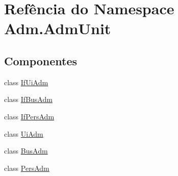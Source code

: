 \hypertarget{namespaceAdm_1_1AdmUnit}{\section{Refência do Namespace Adm.\-Adm\-Unit}
\label{de/d94/namespaceAdm_1_1AdmUnit}
}
\subsection*{Componentes}
\begin{DoxyCompactItemize}
\item 
class \hyperlink{classAdm_1_1AdmUnit_1_1IfUiAdm}{If\-Ui\-Adm}
\item 
class \hyperlink{classAdm_1_1AdmUnit_1_1IfBusAdm}{If\-Bus\-Adm}
\item 
class \hyperlink{classAdm_1_1AdmUnit_1_1IfPersAdm}{If\-Pers\-Adm}
\item 
class \hyperlink{classAdm_1_1AdmUnit_1_1UiAdm}{Ui\-Adm}
\item 
class \hyperlink{classAdm_1_1AdmUnit_1_1BusAdm}{Bus\-Adm}
\item 
class \hyperlink{classAdm_1_1AdmUnit_1_1PersAdm}{Pers\-Adm}
\end{DoxyCompactItemize}
